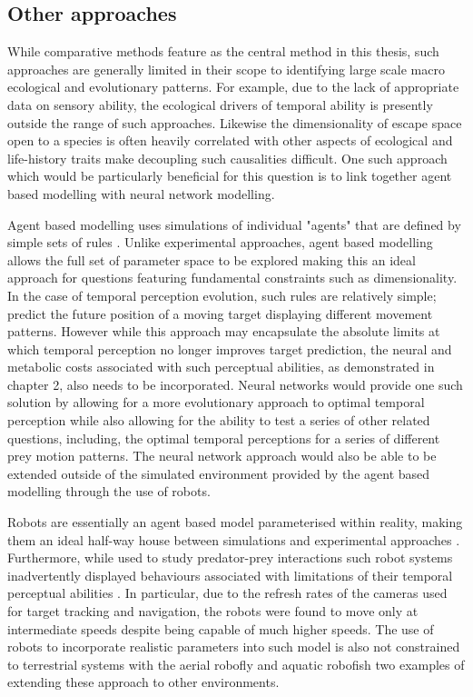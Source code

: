 \subsection{Other approaches}

While comparative methods feature as the central method in this thesis, such approaches are generally limited in their scope to identifying large scale macro ecological and evolutionary patterns. For example, due to the lack of appropriate data on sensory ability, the ecological drivers of temporal ability is presently outside the range of such approaches. Likewise the dimensionality of escape space open to a species is often heavily correlated with other aspects of ecological and life-history traits make decoupling such causalities difficult. One such approach which would be particularly beneficial for this question is to link together agent based modelling with neural network modelling. 


Agent based modelling uses simulations of individual "agents" that are defined by simple sets of rules \citep{tisue2004netlogo}. Unlike experimental approaches, agent based modelling allows the full set of parameter space to be explored making this an ideal approach for questions featuring fundamental constraints such as dimensionality. In the case of temporal perception evolution, such rules are relatively simple; predict the future position of a moving target displaying different movement patterns. However while this approach may encapsulate the absolute limits at which temporal perception no longer improves target prediction, the neural and metabolic costs associated with such perceptual abilities, as demonstrated in chapter 2, also needs to be incorporated. Neural networks would provide one such solution by allowing for a more evolutionary approach to optimal temporal perception while also allowing for the ability to test a series of other related questions, including, the optimal temporal perceptions for a series of different prey motion patterns. The neural network approach would also be able to be extended outside of the simulated environment provided by the agent based modelling through the use of robots. 


Robots are essentially an agent based model parameterised within reality, making them an ideal half-way house between simulations and experimental approaches \citep{floreano2010evolution}. Furthermore, while used to study predator-prey interactions such robot systems inadvertently displayed behaviours associated with limitations of their temporal perceptual abilities \citep{floreano2010evolution}. In particular, due to the refresh rates of the cameras used for target tracking and navigation, the robots were found to move only at intermediate speeds despite being capable of much higher speeds. The use of robots to incorporate realistic parameters into such model is also not constrained to terrestrial systems with the aerial robofly \citep{lauder2001aerodynamics} and aquatic robofish \citep{faria2010novel} two examples of extending these approach to other environments.


